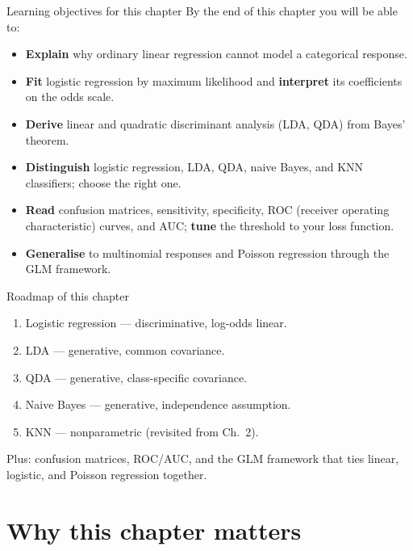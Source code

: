 \documentclass[aspectratio=169,11pt]{beamer}
\begin{document}
\begin{frame}{Learning objectives for this chapter}
  By the end of this chapter you will be able to:
  \begin{itemize}
    \item \textbf{Explain} why ordinary linear regression cannot model
          a categorical response.
    \item \textbf{Fit} logistic regression by maximum likelihood and
          \textbf{interpret} its coefficients on the odds scale.
    \item \textbf{Derive} linear and quadratic discriminant analysis
          (LDA, QDA) from Bayes' theorem.
    \item \textbf{Distinguish} logistic regression, LDA, QDA, naive
          Bayes, and KNN classifiers; choose the right one.
    \item \textbf{Read} confusion matrices, sensitivity, specificity,
          ROC (receiver operating characteristic) curves, and AUC; \textbf{tune} the threshold to your loss
          function.
    \item \textbf{Generalise} to multinomial responses and Poisson
          regression through the GLM framework.
  \end{itemize}
\end{frame}


\begin{frame}{Roadmap of this chapter}
  \begin{takeaway}
    \begin{enumerate}
      \item Logistic regression --- discriminative, log-odds linear.
      \item LDA --- generative, common covariance.
      \item QDA --- generative, class-specific covariance.
      \item Naive Bayes --- generative, independence assumption.
      \item KNN --- nonparametric (revisited from Ch.~2).
    \end{enumerate}
  \end{takeaway}
  Plus: confusion matrices, ROC/AUC, and the GLM framework that ties
  linear, logistic, and Poisson regression together.
\end{frame}

\section{Why this chapter matters}
\end{document}
